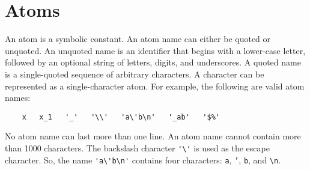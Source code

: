 \section{Atoms}
An atom is a symbolic constant. An atom name can either be quoted or unquoted. An unquoted name is an identifier that begins with a lower-case letter, followed by an optional string of letters, digits, and underscores. A quoted name is a single-quoted sequence of arbitrary characters. A character can be represented as a single-character atom. For example, the following are valid atom names:
\begin{verbatim}
    x   x_1   '_'   '\\'   'a\'b\n'   '_ab'   '$%'
\end{verbatim}
No atom name can last more than one line.   An atom name cannot contain more than 1000 characters. The backslash character \verb+'\'+ is used as the escape character. So, the name \verb+'a\'b\n'+ contains four characters: \texttt{a}, \texttt{'}, \texttt{b}, and \verb+\n+.

